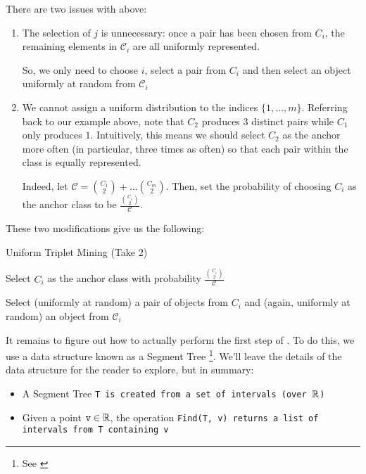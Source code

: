 There are two issues with  above:
\begin{enumerate}
    \item The selection of $j$ is unnecessary: once a pair has been chosen from $C_i$, the remaining elements in $\mathscr{C}_i$ are all uniformly represented.
    
    So, we only need to choose $i$, select a pair from $C_i$ and then select an object uniformly at random from $\mathscr{C}_i$

    \item We cannot assign a uniform distribution to the indices $\{1, \ldots, m\}$.
    Referring back to our example above, note that $C_2$ produces $3$ distinct pairs while $C_1$ only produces $1$.
    Intuitively, this means we should select $C_2$ as the anchor more often (in particular, three times as often) so that each pair within the class is equally represented.

    Indeed, let $\mathcal{C} = \binom{C_1}{2} + \ldots \binom{C_m}{2}$.
    Then, set the probability of choosing $C_i$ as the anchor class to be $\frac{\binom{C_i}{2}}{\mathcal{C}}$.
\end{enumerate}

These two modifications give us the following:

\begin{algorithm}
    \caption{Uniform Triplet Mining (Take 2)}\label{Algorithm:appendix-triplet-mining:uniform-triplet-mining-take-two}

    \nl Select $C_i$ as the anchor class with probability $\frac{\binom{C_i}{2}}{\mathcal{C}}$

    \nl Select (uniformly at random) a pair of objects from $C_i$ and (again, uniformly at random) an object from $\mathscr{C}_i$
\end{algorithm}

It remains to figure out how to actually perform the first step of .
To do this, we use a data structure known as a Segment Tree \footnote{See \href{https://github.com/nicholaspun/IZ-Net/blob/master/faceRecognition/SegmentTree.py}{}}.
We'll leave the details of the data structure for the reader to explore, but in summary:
\begin{itemize}
    \item A Segment Tree \tt{T} is created from a set of intervals (over $\operatorname{\mathbb{R}}$)
    \item Given a point $\texttt{v} \in \operatorname{\mathbb{R}}$, the operation \tt{Find(T, v)} returns a list of intervals from \tt{T} containing \tt{v}
\end{itemize}


